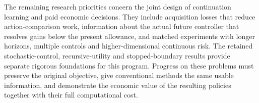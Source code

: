 The remaining research priorities concern the joint design of continuation
learning and paid economic decisions. They include acquisition losses that
reduce action-comparison work, information about the actual future controller
that resolves gains below the present allowance, and matched experiments with
longer horizons, multiple controls and higher-dimensional continuous risk.
The retained stochastic-control, recursive-utility and stopped-boundary results
provide separate rigorous foundations for this program. Progress on these
problems must preserve the original objective, give conventional methods the
same usable information, and demonstrate the economic value of the resulting
policies together with their full computational cost.
